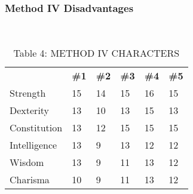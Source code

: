 \documentclass[../TSR-2100-main.tex]{subfiles}
\begin{document}
\begin{multicols}{3}
\subsubsection*{\textbf{Method IV Disadvantages}}
\\
\begin{table}[]
	\caption{Table 4: METHOD IV CHARACTERS}
	\label{table:4}
	\begin{tabularx}{\linewidth}{lXXXXX}
		\textbf{}       & \textbf{\#1} & \textbf{\#2} & \textbf{\#3} & \textbf{\#4} & \textbf{\#5} \\
		\rowcolor[HTML]{CBCEFB} 
		Strength        & 15           & 14           & 15           & 16           & 15           \\
		\rowcolor[HTML]{CBCEFB} 
		Dexterity       & 13           & 10           & 13           & 15           & 13           \\
		Constitution    & 13           & 12           & 15           & 15           & 15           \\
		Intelligence    & 13           & 9            & 13           & 12           & 12           \\
		\rowcolor[HTML]{CBCEFB} 
		Wisdom          & 13           & 9            & 11           & 13           & 12           \\
		\rowcolor[HTML]{CBCEFB} 
		Charisma        & 10           & 9            & 11           & 13           & 12           \\
	\end{tabularx}
\end{table}


\end{multicols}
\end{document}
